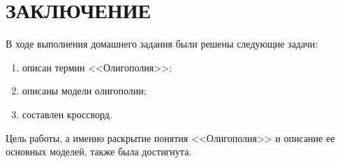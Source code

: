 \chapter*{ЗАКЛЮЧЕНИЕ}

В ходе выполнения домашнего задания были решены следующие задачи:

\begin{enumerate}
	\item описан термин <<Олигополия>>;
	\item описаны модели олигополии;
	\item составлен кроссворд.
\end{enumerate}

Цель работы, а именно раскрытие понятия <<Олигополия>> и описание ее основных моделей, также была достигнута.
